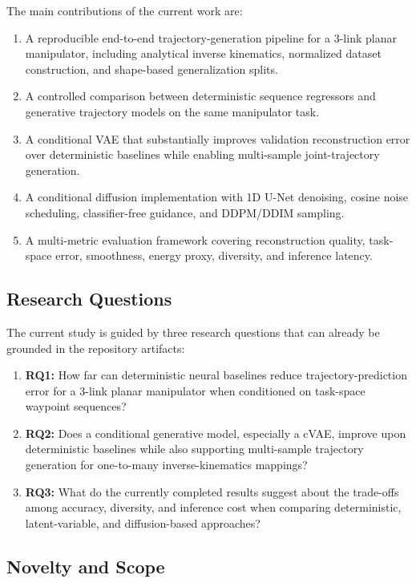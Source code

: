 \documentclass[11pt]{article}
\begin{document}
The main contributions of the current work are:
\begin{enumerate}[leftmargin=1.5em]
    \item A reproducible end-to-end trajectory-generation pipeline for a 3-link planar manipulator, including analytical inverse kinematics, normalized dataset construction, and shape-based generalization splits.
    \item A controlled comparison between deterministic sequence regressors and generative trajectory models on the same manipulator task.
    \item A conditional VAE that substantially improves validation reconstruction error over deterministic baselines while enabling multi-sample joint-trajectory generation.
    \item A conditional diffusion implementation with 1D U-Net denoising, cosine noise scheduling, classifier-free guidance, and DDPM/DDIM sampling.
    \item A multi-metric evaluation framework covering reconstruction quality, task-space error, smoothness, energy proxy, diversity, and inference latency.
\end{enumerate}

\subsection*{Research Questions}

The current study is guided by three research questions that can already be grounded in the repository artifacts:
\begin{enumerate}[leftmargin=1.5em]
    \item \textbf{RQ1:} How far can deterministic neural baselines reduce trajectory-prediction error for a 3-link planar manipulator when conditioned on task-space waypoint sequences?
    \item \textbf{RQ2:} Does a conditional generative model, especially a cVAE, improve upon deterministic baselines while also supporting multi-sample trajectory generation for one-to-many inverse-kinematics mappings?
    \item \textbf{RQ3:} What do the currently completed results suggest about the trade-offs among accuracy, diversity, and inference cost when comparing deterministic, latent-variable, and diffusion-based approaches?
\end{enumerate}

\subsection*{Novelty and Scope}
\end{document}
